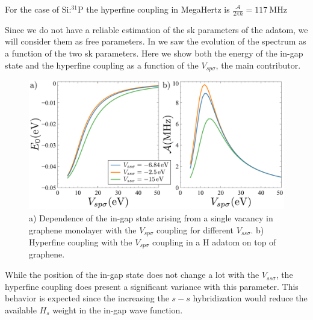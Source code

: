 For the case of Si:$^{31}$P the hyperfine coupling in MegaHertz is\cite{Dehollain2014,Kalra2014}
$\frac{\mathcal{A}}{2\pi\hbar} = \SI{117}{\MHz}$


Since we do not have a reliable estimation of the \ac{sk} parameters of the adatom, we will consider them as free parameters. In  we saw the evolution of the spectrum as a function of the two \ac{sk} parameters. Here we show both the energy of the in-gap state and the hyperfine coupling as a function of the $V_{sp\sigma}$, the main contributor.

\begin{figure}[h!]
\centering
\includegraphics{defects/fig/coupling_hyper.pdf}
\vspace{-10pt}
\caption{a) Dependence of the in-gap state arising from a single vacancy in graphene monolayer with the $V_{sp\sigma}$ coupling for different $V_{ss\sigma}$. b) Hyperfine coupling with the $V_{sp\sigma}$ coupling in a H adatom on top of graphene.} %
\label{hyperfine}
\end{figure}
\FloatBarrier

While the position of the in-gap state does not change a lot with the $V_{ss\sigma}$, the hyperfine coupling does present a significant variance with this parameter. This behavior is expected since the increasing the $s-s$ hybridization would reduce the available $H_s$ weight in the in-gap wave function.

